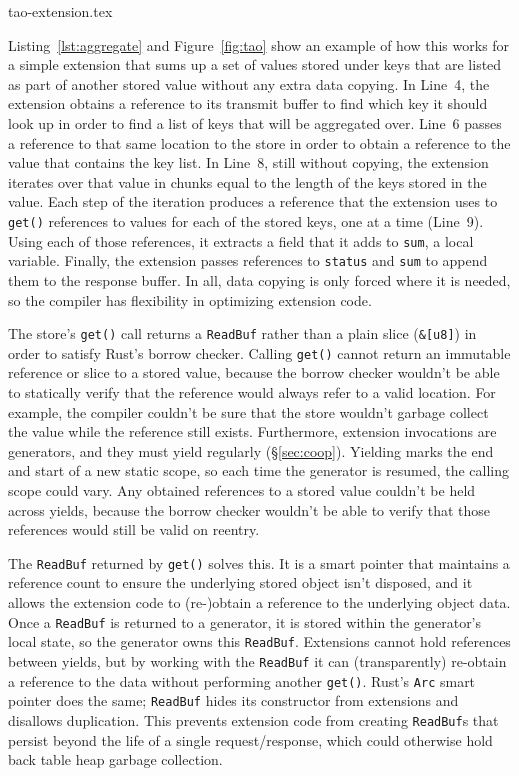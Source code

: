  {tao-extension.tex}

Listing~\ref{lst:aggregate} and Figure~\ref{fig:tao} show an example of how
  this works for a simple extension that sums up a set of values stored under
  keys that are listed as part of another stored value without any extra data copying.
In Line~4, the extension obtains a reference to its transmit buffer to find
  which key it should look up in order to find a list of keys that will be aggregated over.
Line~6 passes a reference to that same location to the store in order to
  obtain a reference to the value that contains the key list.
In Line~8, still without copying, the extension iterates over that value in
  chunks equal to the length of the keys stored in the value.
Each step of the iteration produces a reference that the extension uses
to \texttt{get()}
  references to values for each of the stored keys, one at a time (Line~9).
Using each of those references, it extracts a field that it adds to
  \texttt{sum}, a local variable.
Finally, the extension passes references to \texttt{status} and \texttt{sum} to append
  them to the response buffer.
In all, data copying is only forced where it is needed, so the compiler has
  flexibility in optimizing extension code.

The store's \texttt{get()} call returns a \texttt{ReadBuf} rather than a plain
  slice (\texttt{\&[u8]}) in order to satisfy Rust's borrow checker.
Calling \texttt{get()} cannot return an immutable reference or slice to a stored
  value, because the borrow checker wouldn't be able to statically verify that the
  reference would always refer to a valid location.
For example, the compiler couldn't be sure that the store wouldn't garbage
  collect the value while the reference still exists.
Furthermore, extension invocations are generators, and they must
  yield regularly (\S\ref{sec:coop}).
Yielding marks the end and start of a new static scope, so
  each time the generator is resumed, the calling scope could vary.
Any obtained references to a stored value couldn't be held across yields,
  because the borrow checker wouldn't be able to verify that those
  references would still be valid on reentry.

The \texttt{ReadBuf} returned by \texttt{get()} solves this.
It is a smart pointer that maintains a reference count to ensure
  the underlying stored object isn't disposed, and it allows the extension code
  to (re-)obtain a reference to the underlying object data.
Once a \texttt{ReadBuf} is returned to a generator, it is stored within the
  generator's local state, so the generator owns this \texttt{ReadBuf}.
Extensions cannot hold references between yields,
  but by working with the \texttt{ReadBuf} it can (transparently) re-obtain a
  reference to the data without performing another \texttt{get()}.
Rust's \texttt{Arc} smart pointer does the same;
  \texttt{ReadBuf} hides its constructor from extensions and disallows duplication.
This prevents extension code from creating \texttt{ReadBuf}s that persist
  beyond the life of a single request/response, which could otherwise hold back
  table heap garbage collection.

